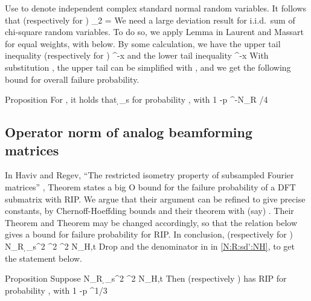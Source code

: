 Use  to denote independent complex standard normal random variables.
It follows that (respectively for )
%
 {
 _2
= 
}
%
We need a large deviation result for i.i.d.\ sum of chi-square random variables.
To do so, we apply Lemma  in Laurent and Massart \cite {LaM00} for equal weights, with  below.
By some calculation, we have the upper tail inequality (respectively for )
%
 {
 
\leq {} ^{-x} 
}
%
and the lower tail inequality
%
 {
 
\leq {} ^{-x} 
}
%
With substitution , the upper tail can be simplified with , and we get the following bound for overall failure probability.

\Result
{Proposition}
{
For , it holds that
%
 {
\geq \d_s 
}
for probability , with
 {
1 -p
  ^{-N_R  /4} 
}
}

\subsection {Operator norm of analog beamforming matrices}

In Haviv and Regev, ``The restricted isometry property of subsampled Fourier matrices'' \cite {KlM17}, Theorem  states a big O bound for the failure probability of a DFT submatrix with  RIP.
We argue that their argument can be refined to give precise constants, by Chernoff-Hoeffding bounds and their theorem  with (say) .
Their Theorem  and Theorem  may be changed accordingly, so that the relation below gives a bound for failure probability for  RIP.
In conclusion, (respectively for )
%
 {
N_R
\geq {} {\d_s^2} ^2 ^2 \log N_{H,t}
}
%
Drop  and the denominator  in  in \eqref {N:R:sd':NH}, to get the statement below.

\Result
{Proposition}
{
Suppose
%
 {
N_R
\geq {} {\d_s^2} ^2 \log N_{H,t}
}
%
Then  (respectively ) has  RIP for probability , with
 {
1 -p
\leq {} ^{1/3} 
}
}



